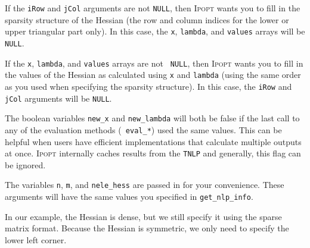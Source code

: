 \documentclass[10pt]{article}
\newcommand{\Ipopt}{\textsc{Ipopt}\xspace}
\begin{document}
If the {\tt iRow} and {\tt jCol} arguments are not {\tt NULL}, then
\Ipopt wants you to fill in the sparsity structure of the Hessian
(the row and column indices for the lower or upper triangular part
only). In this case, the {\tt x}, {\tt lambda}, and {\tt values}
arrays will be {\tt NULL}.

If the {\tt x}, {\tt lambda}, and {\tt values} arrays are not {\tt
  NULL}, then \Ipopt wants you to fill in the values of the Hessian
as calculated using {\tt x} and {\tt lambda} (using the same order as
you used when specifying the sparsity structure). In this case, the
{\tt iRow} and {\tt jCol} arguments will be {\tt NULL}.

The boolean variables {\tt new\_x} and {\tt new\_lambda} will both be
false if the last call to any of the evaluation methods ({\tt
  eval\_*}) used the same values. This can be helpful when users have
efficient implementations that calculate multiple outputs at once.
\Ipopt internally caches results from the {\tt TNLP} and generally,
this flag can be ignored.

The variables {\tt n}, {\tt m}, and {\tt nele\_hess} are passed in for
your convenience. These arguments will have the same values you
specified in {\tt get\_nlp\_info}.

In our example, the Hessian is dense, but we still specify it using the
sparse matrix format. Because the Hessian is symmetric, we only need to 
specify the lower left corner.
\end{document}
